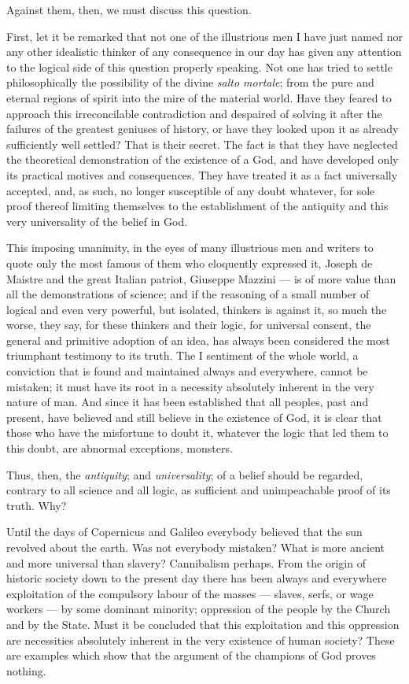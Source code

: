 \documentclass[12pt]{report}
\begin{document}
Against them, then, we must discuss this question.


First, let it be remarked that not one of the illustrious men I have just named nor any other idealistic thinker of any consequence in our day has given any attention to the logical side of this question properly speaking. Not one has tried to settle philosophically the possibility of the divine \emph{salto mortale}; from the pure and eternal regions of spirit into the mire of the material world. Have they feared to approach this irreconcilable contradiction and despaired of solving it after the failures of the greatest geniuses of history, or have they looked upon it as already sufficiently well settled? That is their secret. The fact is that they have neglected the theoretical demonstration of the existence of a God, and have developed only its practical motives and consequences. They have treated it as a fact universally accepted, and, as such, no longer susceptible of any doubt whatever, for sole proof thereof limiting themselves to the establishment of the antiquity and this very universality of the belief in God.


This imposing unanimity, in the eyes of many illustrious men and writers to quote only the most famous of them who eloquently expressed it, Joseph de Maistre and the great Italian patriot, Giuseppe Mazzini — is of more value than all the demonstrations of science; and if the reasoning of a small number of logical and even very powerful, but isolated, thinkers is against it, so much the worse, they say, for these thinkers and their logic, for universal consent, the general and primitive adoption of an idea, has always been considered the most triumphant testimony to its truth. The I sentiment of the whole world, a conviction that is found and maintained always and everywhere, cannot be mistaken; it must have its root in a necessity absolutely inherent in the very nature of man. And since it has been established that all peoples, past and present, have believed and still believe in the existence of God, it is clear that those who have the misfortune to doubt it, whatever the logic that led them to this doubt, are abnormal exceptions, monsters.


Thus, then, the \emph{antiquity}; and \emph{universality}; of a belief should be regarded, contrary to all science and all logic, as sufficient and unimpeachable proof of its truth. Why?


Until the days of Copernicus and Galileo everybody believed that the sun revolved about the earth. Was not everybody mistaken? What is more ancient and more universal than slavery? Cannibalism perhaps. From the origin of historic society down to the present day there has been always and everywhere exploitation of the compulsory labour of the masses — slaves, serfs, or wage workers — by some dominant minority; oppression of the people by the Church and by the State. Must it be concluded that this exploitation and this oppression are necessities absolutely inherent in the very existence of human society? These are examples which show that the argument of the champions of God proves nothing.
\end{document}
